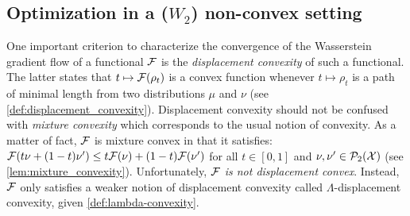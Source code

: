 


\subsection{Optimization in a ($W_2$) non-convex setting}
\label{subsection:barrier_optimization}
One important criterion to characterize the convergence of the Wasserstein gradient flow of a functional ${{\mathcal F}}$ is the \textit{displacement convexity} of such a functional. The latter states that $t\mapsto {{\mathcal F}}(\rho_t)$ is a convex function whenever $t\mapsto\rho_t$ is a path of minimal length from two distributions $\mu$ and $\nu$ (see \cref{def:displacement_convexity}). %
Displacement convexity should not be confused with \textit{mixture convexity} which corresponds to the usual notion of convexity. As a matter of fact, ${{\mathcal F}}$ is mixture convex in that it satisfies: ${{\mathcal F}}(t\nu +(1-t)\nu')\leq t{{\mathcal F}}(\nu)+(1-t){{\mathcal F}}(\nu')$ for all $t\in [0,1]$ and $\nu,\nu'\in\mathcal{P}_2({{\mathcal X}})$ (see \cref{lem:mixture_convexity}). Unfortunately, \textit{${{\mathcal F}}$ is not displacement convex}. Instead, ${{\mathcal F}}$ only satisfies a weaker notion of displacement convexity called $\Lambda$-displacement convexity, given \cref{def:lambda-convexity}. 
